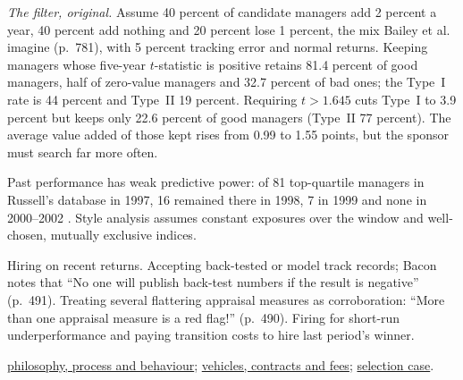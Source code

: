 \begin{qfmethod}
\emph{The filter, original.} Assume 40 percent of candidate managers add 2 percent a year, 40 percent add nothing and 20 percent lose 1 percent, the mix Bailey et al. imagine (p.~781), with 5 percent tracking error and normal returns. Keeping managers whose five-year $t$-statistic is positive retains 81.4 percent of good managers, half of zero-value managers and 32.7 percent of bad ones; the Type~I rate is 44 percent and Type~II 19 percent. Requiring $t>1.645$ cuts Type~I to 3.9 percent but keeps only 22.6 percent of good managers (Type~II 77 percent). The average value added of those kept rises from 0.99 to 1.55 points, but the sponsor must search far more often.

 Past performance has weak predictive power: of 81 top-quartile managers in Russell's database in 1997, 16 remained there in 1998, 7 in 1999 and none in 2000--2002 \citep[chap.~7, p.~466]{managing-investment-portfolios-2007}. Style analysis assumes constant exposures over the window and well-chosen, mutually exclusive indices.

 Hiring on recent returns. Accepting back-tested or model track records; Bacon notes that ``No one will publish back-test numbers if the result is negative'' (p.~491). Treating several flattering appraisal measures as corroboration: ``More than one appraisal measure is a red flag!'' (p.~490). Firing for short-run underperformance and paying transition costs to hire last period's winner.

 \hyperref[meth:manager-philosophy-process-behaviour]{philosophy, process and behaviour}; \hyperref[meth:vehicle-contract-fee-analysis]{vehicles, contracts and fees}; \hyperref[ex:manager-selection-case]{selection case}.

\end{qfmethod}

